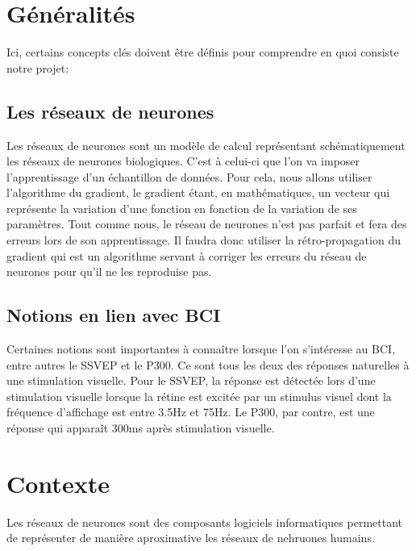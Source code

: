 	

	\section{Généralités} %
	\label{sec:généralité}
	
	Ici, certains concepts clés doivent être définis pour comprendre en quoi consiste notre projet: 
	\subsection{Les réseaux de neurones} %
	\label{sub:les_réseaux_de_neurones}
	 Les réseaux de neurones sont un modèle de calcul représentant schématiquement les réseaux de neurones biologiques. C'est à celui-ci que 
	l'on va imposer l'apprentissage d'un échantillon de données. Pour cela, nous allons 
	utiliser l'algorithme du gradient, le gradient étant, en mathématiques, un vecteur qui
	 représente la variation d'une fonction en fonction de la variation de ses paramètres. Tout
	  comme nous, le réseau de neurones n'est pas parfait et fera des erreurs lors de son 
	  apprentissage. Il faudra donc utiliser la rétro-propagation du gradient qui est un algorithme 
	  servant à corriger les erreurs du réseau de neurones pour qu'il ne les reproduise pas.

	\subsection{Notions en lien avec BCI} %
	\label{sub:notion_lien}
	Certaines notions sont importantes à connaître lorsque l'on s’intéresse au BCI, entre autres le SSVEP  et le P300. Ce sont tous les deux des réponses naturelles à une stimulation visuelle. Pour le SSVEP, la réponse est détectée lors d'une stimulation visuelle lorsque la rétine est excitée par un stimulus visuel dont la fréquence d'affichage est entre 3.5Hz et 75Hz. Le P300, par contre, 
	est une réponse qui apparaît 300ms après stimulation visuelle. 
	

	\section{Contexte} %
	\label{sec:contexte}
	
	   Les réseaux de neurones sont des composants logiciels informatiques permettant de représenter de manière aproximative les réseaux de nehruones humains.

